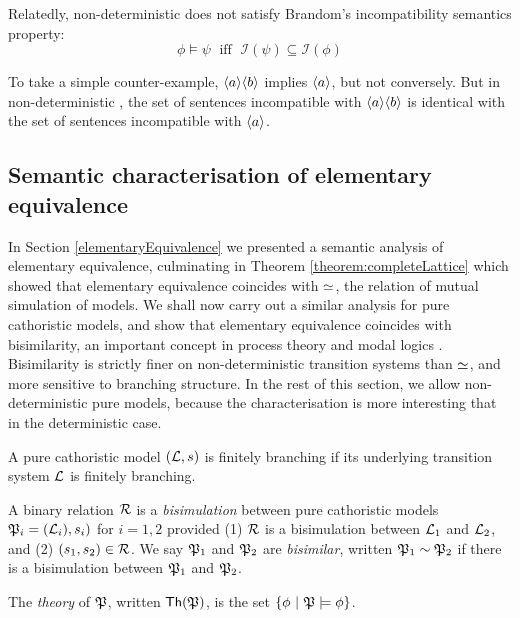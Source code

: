 \NI Relatedly, non-deterministic \cathoristic{} does not satisfy Brandom's
incompatibility semantics property:
\[
   \phi \models \psi \; \mbox{ iff } \; \mathcal{I}(\psi) \subseteq \mathcal{I}(\phi)
\]

\NI To take a simple counter-example, $\MAY{a}\MAY{b}$ implies $\MAY{a}$,
but not conversely.  But in non-deterministic \cathoristic{}, the set of sentences
incompatible with $\MAY{a}\MAY{b}$ is identical with the set of
sentences incompatible with $\MAY{a}$.

\subsection{Semantic characterisation of elementary equivalence}

In Section \ref{elementaryEquivalence} we presented a semantic
analysis of elementary equivalence, culminating in Theorem
\ref{theorem:completeLattice} which showed that elementary equivalence
coincides with $\simeq$, the relation of mutual simulation of
models. We shall now carry out a similar analysis for pure cathoristic
models, and show that elementary equivalence coincides with
bisimilarity, an important concept in process theory and modal logics
\cite{SangiorgiD:intbisac}. Bisimilarity is strictly finer on
non-deterministic transition systems than $\simeq$, and more
sensitive to branching structure.  In the rest of this section, we
allow non-deterministic pure models, because the characterisation is
more interesting that in the deterministic case.

\begin{definition}
A pure cathoristic model $(\mathcal{L}, s)$ is finitely branching if its
underlying transition system $\mathcal{L}$ is finitely branching.
\end{definition}

\begin{definition}
A binary relation $\mathcal{R}$ is a \emph{bisimulation} between pure cathoristic
models $\frak{P}_i = (\mathcal{L}_i), s_i)$ for $i = 1, 2$ provided (1) $\mathcal{R}$ is
a bisimulation between $\mathcal{L}_1$ and $\mathcal{L}_2$, and (2) $(s_1, s_2) \in
\mathcal{R}$. We say $\frak{P}_1$ and $\frak{P}_2$ are \emph{bisimilar}, written
$\frak{P}_1 \sim \frak{P}_2$ if there is a bisimulation between $\frak{P}_1$ and
$\frak{P}_2$.
\end{definition}

\begin{definition}
The \emph{theory} of $\frak{P}$, written $\mathsf{Th}(\frak{P})$, is the set
$\{\phi\ |\ \frak{P} \models \phi\}$.
\end{definition}

